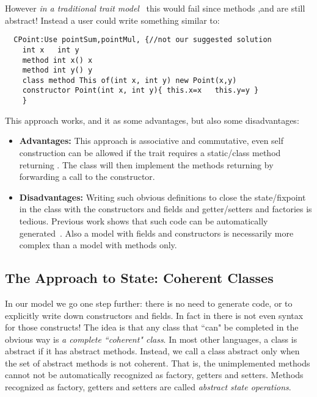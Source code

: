 \noindent However \emph{in a traditional trait model}~\cite{Traits:ECOOP2003} this would fail since methods \Q@x@,\Q@y@ and \Q@of@ are still abstract!
Instead a user could write something similar to:

\begin{lstlisting}
  CPoint:Use pointSum,pointMul, {//not our suggested solution
    int x   int y
    method int x() x       
    method int y() y
    class method This of(int x, int y) new Point(x,y)
    constructor Point(int x, int y){ this.x=x   this.y=y }
    }
\end{lstlisting}

\noindent This approach works, and it as some advantages, but also
some disadvantages: 

\begin{itemize}

\item {\bf Advantages:} This approach is associative and commutative, even self construction
  can be allowed if the trait requires a static/class method
  returning \Q@This@. The class will then implement the methods returning \Q@This@
  by forwarding a call to the constructor.
  
\item {\bf Disadvantages:} Writing such obvious definitions to close
  the state/fixpoint in the class 
   with the constructors and fields and getter/setters and factories is tedious.
   Previous work shows that such code can be automatically
   generated~\cite{wang2016classless}.
   Also a model with fields and constructors is necessarily
   more complex than a model with methods only.

\end{itemize}

\subsection{The \name Approach to State: Coherent Classes}

In our model we go one step further: there is no need to generate
code, or to explicitly write down constructors and fields. In fact in
\name there is not even syntax for those constructs!  The idea is that
any class that ``can" be completed in the obvious way  is \emph{a
  complete ``coherent" class}.  In most other languages, a class is
abstract if it has abstract methods.  Instead, we call a class
abstract only when the set of abstract methods is not coherent. That
is, the unimplemented methods cannot not be automatically recognized
as factory, getters and setters. Methods recognized as factory, getters and setters are called
\emph{abstract state operations}.
  
